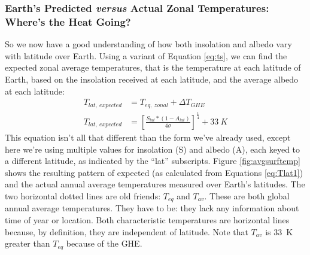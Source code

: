 \subsubsection{Earth's Predicted \textit{versus} Actual Zonal Temperatures: Where's the Heat Going?}
So we now have a good understanding of how both insolation and albedo vary with latitude over Earth. Using a variant of Equation \ref{eq:ts}, we can find the expected zonal average temperatures, that is the temperature at each latitude of Earth, based on the insolation received at each latitude, and the average albedo at each latitude:
\begin{align}
	T_{lat,\ expected}&=T_{eq,\ zonal}+\Delta T_{GHE}\\ \label{eq:Tlat1}
	T_{lat,\ expected}&=\left[\frac{S_{lat}*\left(1-A_{lat}\right)}{4 \sigma}\right]^{\frac{1}{4}}+ 33\ K
\end{align}
This equation isn't all that different than the form we've already used, except here we're using multiple values for insolation (S) and albedo (A), each keyed to a different latitude, as indicated by the ``lat'' subscripts. Figure \ref{fig:avgsurftemp} shows the resulting pattern of expected (as calculated from Equations \ref{eq:Tlat1}) and the actual annual average temperatures measured over Earth's latitudes. The two horizontal dotted lines are old friends: $T_{eq}$ and $T_{av}$. These are both global annual average temperatures. They have to be: they lack any information about time of year or location. Both characteristic temperatures are horizontal lines because, by definition, they are independent of latitude. Note that $T_{av}$ is \SI{33}{\kelvin} greater than $T_{eq}$ because of the GHE.\\
